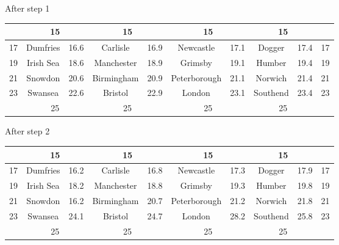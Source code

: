 
\begin{slide}{}

\begin{minipage}{0.15\linewidth}\raggedright
After step 1\end{minipage}
\begin{tabular}{c|cc|cc|cc|cc|c}
&\multicolumn{2}{c|}{15}&\multicolumn{2}{c|}{15}&\multicolumn{2}{c|}{15}&\multicolumn{2}{c|}{15} \\
\hline 17 & Dumfries & 16.6 & Carlisle  & 16.9 & Newcastle & 17.1 & Dogger & 17.4&17\\
\hline 19 & Irish Sea & 18.6 & Manchester & 18.9 & Grimsby & 19.1 & Humber & 19.4&19\\
\hline 21 & Snowdon & 20.6 & Birmingham & 20.9 & Peterborough & 21.1 & Norwich & 21.4&21\\
\hline 23 & Swansea & 22.6 & Bristol & 22.9 & London & 23.1 & Southend & 23.4&23\\ \hline
&\multicolumn{2}{c|}{25}&\multicolumn{2}{c|}{25}&\multicolumn{2}{c|}{25}&\multicolumn{2}{c|}{25}
\end{tabular}

\begin{minipage}{0.15\linewidth}\raggedright
After step 2\end{minipage}
\begin{tabular}{c|cc|cc|cc|cc|c}
&\multicolumn{2}{c|}{15}&\multicolumn{2}{c|}{15}&\multicolumn{2}{c|}{15}&\multicolumn{2}{c|}{15} \\
\hline 17 & Dumfries & 16.2 & Carlisle  & 16.8 & Newcastle & 17.3 & Dogger & 17.9&17\\
\hline 19 & Irish Sea & 18.2 & Manchester & 18.8 & Grimsby & 19.3 & Humber & 19.8&19\\
\hline 21 & Snowdon & 16.2 & Birmingham & 20.7 & Peterborough & 21.2 & Norwich & 21.8&21\\
\hline 23 & Swansea & 24.1 & Bristol & 24.7 & London & 28.2 & Southend & 25.8 & 23\\ \hline
&\multicolumn{2}{c|}{25}&\multicolumn{2}{c|}{25}&\multicolumn{2}{c|}{25}&\multicolumn{2}{c|}{25}
\end{tabular}


\end{slide}

